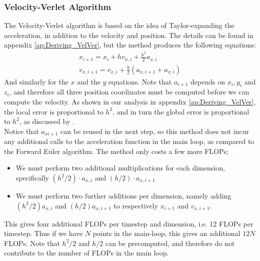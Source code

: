 \documentclass[a4paper, 10pt]{article}
\begin{document}
\subsubsection{Velocity-Verlet Algorithm}
The Velocity-Verlet algorithm is based on the idea of Taylor-expanding the acceleration, in addition to the velocity and position. The details can be found in appendix \ref{ap:Deriving_VelVer}, but the method produces the following equations:
\begin{equation} \label{eq:Vel_Ver_eq}
\begin{split}
x_{i+1}=x_i+hv_{x,i}+\frac{h^2}{2}a_{x,i}\\
v_{x,i+1}=v_{x,i}+\frac{h}{2}\left(a_{x,i+1}+a_{x,i}\right)
\end{split}
\end{equation}
And similarly for the $x$ and the $y$ equations. Note that $a_{i+1}$ depends on $x_i, y_i$ and $z_i$, and therefore all three position coordinates must be computed before we can compute the velocity. As shown in our analysis in appendix \ref{ap:Deriving_VelVer}, the local error is proportional to $h^3$, and in turn the global error is proportional to $h^2$, as discussed by \cite{Global_VV}. \\
\linebreak
Notice that $a_{x i+1}$ can be reused in the next step, so this method does not incur any additional calls to the acceleration function in the main loop, as compared to the Forward Euler algorithm. The method only costs a few more FLOPs;
\begin{itemize}
\item We must perform two additional multiplications for each dimension, specifically $(h^2/2)\cdot a_{x,i}$ and $(h/2)\cdot a_{x, i+1}$
\item We must perform two further additions per dimension, namely adding $(h^2/2)a_{x,i}$ and $(h/2)a_{x, i+1}$ to respectively $x_{i+1}$ and $v_{x, i+1}$.
\end{itemize} 
This gives four additional FLOPs per timestep and dimension, i.e. 12 FLOPs per timestep. Thus if we have $N$ points in the main-loop, this gives an additional $12N$ FLOPs. Note that $h^2/2$ and $h/2$ can be precomputed, and therefore do not contribute to the number of FLOPs in the main loop. 
\end{document}
